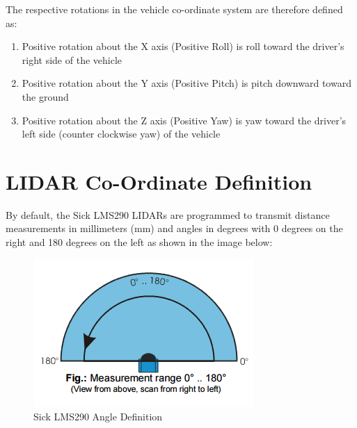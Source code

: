 \newpage

\noindent The respective rotations in the vehicle co-ordinate system are therefore defined as:

\begin{enumerate}
\item Positive rotation about the X axis (Positive Roll) is roll toward the driver's right side of the vehicle
\item Positive rotation about the Y axis (Positive Pitch) is pitch downward toward the ground
\item Positive rotation about the Z axis (Positive Yaw) is yaw toward the driver's left side (counter clockwise yaw) of the vehicle
\end{enumerate}

\newpage

\section{LIDAR Co-Ordinate Definition}
By default, the Sick LMS290 LIDARs are programmed to transmit distance measurements in millimeters (mm) and angles in degrees with 0 degrees on the right and 180 degrees on the left as shown in the image below:

\begin{figure}[h!]
\centering
\includegraphics[scale=.9]{Photos/LIDAR_AngleDef.png}
\caption[Sick LMS290 Angle Definition]{Sick LMS290 Angle Definition \protect \footnotemark}
\label{fig:sick_angledef}
\end{figure} 
